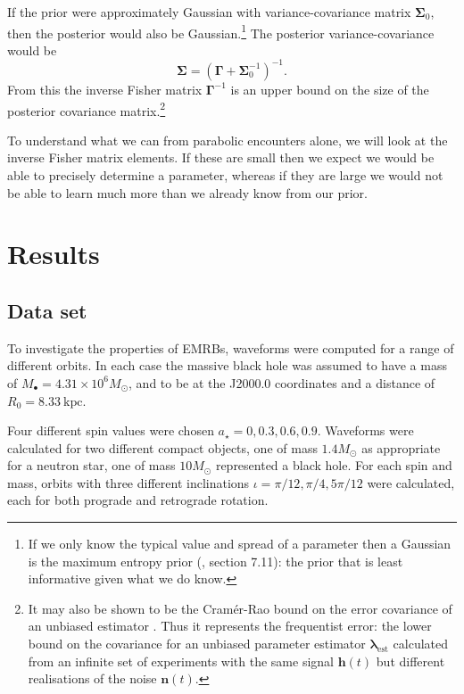 \documentclass[useAMS,usedcolumn,usegraphicx,usenatbib]{mn2e}
\newcommand{\sub}[1]{\ensuremath{_\mathrm{#1}}}
\begin{document}
If the prior were approximately Gaussian with variance-covariance matrix $\boldsymbol{\Sigma}_0$, then the posterior would also be Gaussian.\footnote{If we only know the typical value and spread of a parameter then a Gaussian is the maximum entropy prior (\citealt{Jaynes2003}, section 7.11): the prior that is least informative given what we do know.} The posterior variance-covariance would be \citep{Cutler1994, Vallisneri2008}
\begin{equation}
\boldsymbol{\Sigma} = \left(\boldsymbol{\Gamma} + \boldsymbol{\Sigma}_0^{-1}\right)^{-1}.
\label{eq:Posterior_variance}
\end{equation}
From this the inverse Fisher matrix $\boldsymbol{\Gamma}^{-1}$ is an upper bound on the size of the posterior covariance matrix.\footnote{It may also be shown to be the Cram\'{e}r-Rao bound on the error covariance of an unbiased estimator \citep{Cutler1994, Vallisneri2008}. Thus it represents the frequentist error: the lower bound on the covariance for an unbiased parameter estimator $\boldsymbol{\lambda}\sub{est}$ calculated from an infinite set of experiments with the same signal $\boldsymbol{h}(t)$ but different realisations of the noise $\boldsymbol{n}(t)$.}

To understand what we can from parabolic encounters alone, we will look at the inverse Fisher matrix elements. If these are small then we expect we would be able to precisely determine a parameter, whereas if they are large we would not be able to learn much more than we already know from our prior.

\section{Results}\label{sec:Results}

\subsection{Data set}

To investigate the properties of EMRBs, waveforms were computed for a range of different orbits. In each case the massive black hole was assumed to have a mass of $M_\bullet = 4.31 \times 10^6 M_\odot$, and to be at the J2000.0 coordinates and a distance of $R_0 = 8.33~\mathrm{kpc}$.

Four different spin values were chosen $a_\star = 0, 0.3, 0.6, 0.9$. Waveforms were calculated for two different compact objects, one of mass $1.4 M_\odot$ as appropriate for a neutron star, one of mass $10 M_\odot$ represented a black hole. For each spin and mass, orbits with three different inclinations $\iota = \pi/12, \pi/4, 5\pi/12$ were calculated, each for both prograde and retrograde rotation.
\end{document}
